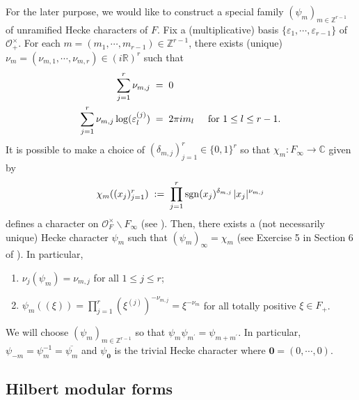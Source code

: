 \documentclass[11pt]{amsart}
\theoremstyle{remark}
\newcommand\mbf[1]{\mathbf{#1}}
\newcommand\ov[1]{\overline{#1}}
\newcommand{\inte}{\mathbb{Z}}
\newcommand{\real}{\mathbb{R}}
\newcommand{\comp}{\mathbb{C}}
\newcommand{\eps}{\varepsilon}
\newcommand{\clo}{\mathcal{O}}
\newcommand{\bslash}{\backslash}
\newcommand{\eq}{\;=\;}
\newcommand{\deq}{\;:=\;}
\def\thin{{\hskip 1pt}}
\newcommand{\sgn}{\mathrm{sgn}}
\begin{document}
For the later purpose, we would like to construct a special family $(\psi_m)_{m\in\inte^{r-1}}$ of unramified Hecke characters of $F$. Fix a (multiplicative) basis $\{\eps_1,\cdots,\eps_{r-1}\}$ of~$\clo_+^\times$. For each \mbox{$m=(m_1,\cdots,m_{r-1})\in\inte^{r-1}$}, there exists (unique) \mbox{$\nu_m=(\nu_{m,1},\cdots,\nu_{m,r})\in (i\real)^r$} such that
\begin{equation}
\begin{aligned}
\label{nulinearrel}
    \sum_{j=1}^r\nu_{m,j}&\eq 0 \\
    \sum_{j=1}^r \nu_{m,j}\log (\eps_l^{(j)})&\eq 2\pi i m_l \hspace{0.5cm}\text{for }1\leq l\leq r-1.
\end{aligned}
\end{equation}
It is possible to make a choice of $(\delta_{m,j})_{j=1}^r\in\{0,1\}^r$ so that $\chi_m:F_\infty\rightarrow\comp$ given by
\begin{align*}
    \chi_m((x_j)_{j=1}^r)\deq\prod_{j=1}^r\sgn(x_j)^{\delta_{m,j}}\thin|x_j|^{\nu_{m,j}}
\end{align*}
defines a character on $\clo_F^\times\bslash F_\infty$ (see \cite[Section~1.7,~p.78]{bump}). Then, there exists a (not necessarily unique) Hecke character $\psi_m$ such that $(\psi_m)_{\infty}=\chi_m$ (see Exercise 5 in Section 6 of \cite[Chapter~VII]{neukirch}). In particular,
\begin{enumerate}[label=\rm{(\arabic*)}]
    \item $\nu_j(\psi_m)=\nu_{m,j}$ for all $1\leq j\leq r$;
    \item $\psi_m((\xi))=\prod_{j=1}^r(\xi^{(j)})^{-\nu_{m,j}}=\xi^{-\nu_m}$ for all totally positive $\xi\in F_+$.
\end{enumerate}
We will choose $(\psi_m)_{m\in\inte^{r-1}}$ so that $\psi_m\psi_{m^\prime}=\psi_{m+m^\prime}$. In particular, $\psi_{-m}=\psi_m^{-1}=\ov{\psi_m}$ and $\psi_{\mbf{0}}$ is the trivial Hecke character where $\mbf{0}=(0,\cdots,0)$. 

\subsection{Hilbert modular forms}
\end{document}
